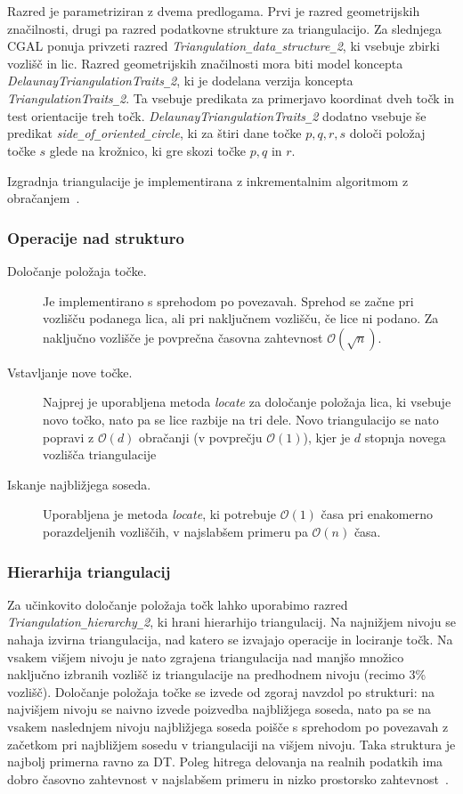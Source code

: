 \documentclass[a4paper, 12pt]{book}
\newcommand{\OO}{\ensuremath{\mathcal{O}}} %
\newcommand{\U}{\texttt{\_}}
\begin{document}
Razred je parametriziran z dvema predlogama. Prvi je razred geometrijskih značilnosti, drugi pa razred podatkovne strukture za triangulacijo. Za slednjega CGAL ponuja privzeti razred \textit{ Triangulation\U data\U structure\U 2}, ki vsebuje zbirki vozlišč in lic. Razred geometrijskih značilnosti mora biti model koncepta \textit{DelaunayTriangulationTraits\U 2}, ki je dodelana verzija koncepta \textit{TriangulationTraits\U 2}. Ta vsebuje predikata za primerjavo koordinat dveh točk in test orientacije treh točk. \textit{DelaunayTriangulationTraits\U 2} dodatno vsebuje še predikat \textit{side\U of\U oriented\U circle}, ki za štiri dane točke $p, q, r, s$ določi položaj točke $s$ glede na krožnico, ki gre skozi točke $p, q$ in $r$.

Izgradnja triangulacije je implementirana z inkrementalnim algoritmom z obračanjem~\cite{cgal:y-t2-16b}.

\subsubsection{Operacije nad strukturo}
\begin{description}
\item[Določanje položaja točke.] Je implementirano s sprehodom po povezavah. Sprehod se začne pri vozlišču podanega lica, ali pri naključnem vozlišču, če lice ni podano. Za naključno vozlišče je povprečna časovna zahtevnost $\OO(\sqrt{n})$.
\item[Vstavljanje nove točke.] Najprej je uporabljena metoda \textit{locate} za določanje položaja lica, ki vsebuje novo točko, nato pa se lice razbije na tri dele. Novo triangulacijo se nato popravi z $\OO(d)$ obračanji (v povprečju $\OO(1)$), kjer je $d$ stopnja novega vozlišča triangulacije
\item[Iskanje najbližjega soseda.] Uporabljena je metoda \textit{locate}, ki potrebuje $\OO(1)$ časa pri enakomerno porazdeljenih vozliščih, v najslabšem primeru pa $\OO(n)$ časa.
\end{description}

\subsubsection{Hierarhija triangulacij}
Za učinkovito določanje položaja točk lahko uporabimo razred \textit{Trian\-gu\-la\-tion\U hier\-archy\U 2}, ki hrani hierarhijo triangulacij. Na najnižjem nivoju se nahaja izvirna triangulacija, nad katero se izvajajo operacije in lociranje točk. Na vsakem višjem nivoju je nato zgrajena triangulacija nad manjšo množico naključno izbranih vozlišč iz triangulacije na predhodnem nivoju (recimo 3\% vozlišč). Določanje položaja točke se izvede od zgoraj navzdol po strukturi: na najvišjem nivoju se naivno izvede poizvedba najbližjega soseda, nato pa se na vsakem naslednjem nivoju najbližjega soseda poišče s sprehodom po povezavah z začetkom pri najbližjem sosedu v triangulaciji na višjem nivoju. Taka struktura je najbolj primerna ravno za DT. Poleg hitrega delovanja na realnih podatkih ima dobro časovno zahtevnost v najslabšem primeru in nizko prostorsko zahtevnost~\cite{Olivier}.
\end{document}
